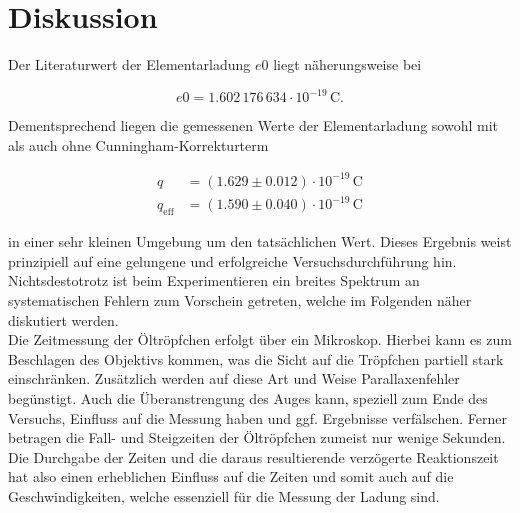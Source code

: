 %

%
\section{Diskussion}
\label{sec:Diskussion}

Der Literaturwert \cite{Elementarladung} der Elementarladung $e0$ liegt näherungsweise bei 

\begin{equation*}
    e0 = 1.602\,176\,634\cdot{}10^{-19}\,\unit{\coulomb}.
\end{equation*}

\noindent Dementsprechend liegen die gemessenen Werte der Elementarladung sowohl mit als auch ohne Cunningham-Korrekturterm 

\begin{align*}
    q            &= \left(1.629\pm0.012\right)\cdot10^{-19}\,\unit{\coulomb} \\
    q_\text{eff} &= \left(1.590 \pm0.040\right)\cdot10^{-19}\,\unit{\coulomb} 
\end{align*}

\noindent in einer sehr kleinen Umgebung um den tatsächlichen Wert. Dieses Ergebnis weist prinzipiell auf eine gelungene und 
erfolgreiche Versuchsdurchführung hin. Nichtsdestotrotz ist beim Experimentieren ein breites Spektrum an systematischen 
Fehlern zum Vorschein getreten, welche im Folgenden näher diskutiert werden.\\

\noindent Die Zeitmessung der Öltröpfchen erfolgt über ein Mikroskop. Hierbei kann es zum Beschlagen des Objektivs 
kommen, was die Sicht auf die Tröpfchen partiell stark einschränken. Zusätzlich werden auf diese Art und Weise 
Parallaxenfehler begünstigt. Auch die Überanstrengung des Auges kann, speziell zum Ende des Versuchs, Einfluss auf die 
Messung haben und ggf. Ergebnisse verfälschen. Ferner betragen die Fall- und Steigzeiten der Öltröpfchen zumeist nur 
wenige Sekunden. Die Durchgabe der Zeiten und die daraus resultierende verzögerte Reaktionszeit hat also einen erheblichen 
Einfluss auf die Zeiten und somit auch auf die Geschwindigkeiten, welche essenziell für die Messung der Ladung sind.\\

